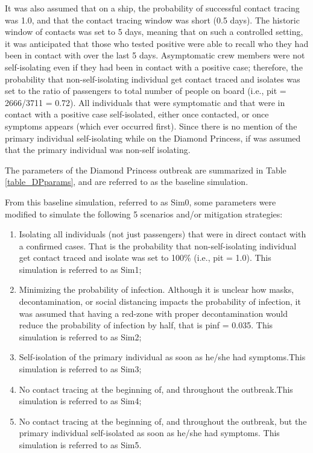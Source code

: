 \documentclass[sr]{drdc-report}
\begin{document}
It was also assumed that on a ship, the probability of successful contact tracing was 1.0, and that the contact tracing window was short (0.5 days). The historic window of contacts was set to 5 days, meaning that on such a controlled setting, it was anticipated that those who tested positive were able to recall who they had been in contact with over the last 5 days. Asymptomatic crew members were not self-isolating even if they had been in contact with a positive case; therefore, the probability that non-self-isolating individual get contact traced and isolates was set to the ratio of passengers to total number of people on board (i.e., pit = 2666/3711 = 0.72).  All individuals that were symptomatic and that were in contact with a positive case self-isolated, either once contacted, or once symptoms appears (which ever occurred first). Since there is no mention of the primary individual self-isolating while on the Diamond Princess, if was assumed that the primary individual was non-self isolating. 

The parameters of the Diamond Princess outbreak are summarized in Table \ref{table_DPparams}, and are referred to as the baseline simulation. 

From this baseline simulation, referred to as Sim0, some parameters were modified to simulate the following 5 scenarios and/or mitigation strategies:
\begin{enumerate}
\item Isolating all individuals (not just passengers) that were in direct contact with a confirmed cases. That is the probability that non-self-isolating individual get contact traced and isolate was set to 100\% (i.e., pit = 1.0). This simulation is referred to as Sim1;
\item Minimizing the probability of infection. Although it is unclear how masks, decontamination, or social distancing impacts the probability of infection, it was assumed that having a red-zone with proper decontamination would reduce the probability of infection by half, that is pinf = 0.035. This simulation is referred to as Sim2;
\item Self-isolation of the primary individual as soon as he/she had symptoms.This simulation is referred to as Sim3;
\item No contact tracing at the beginning of, and throughout the outbreak.This simulation is referred to as Sim4;
\item No contact tracing at the beginning of, and throughout the outbreak, but the primary individual self-isolated as soon as he/she had symptoms. This simulation is referred to as Sim5. 
\end{enumerate}
\end{document}
